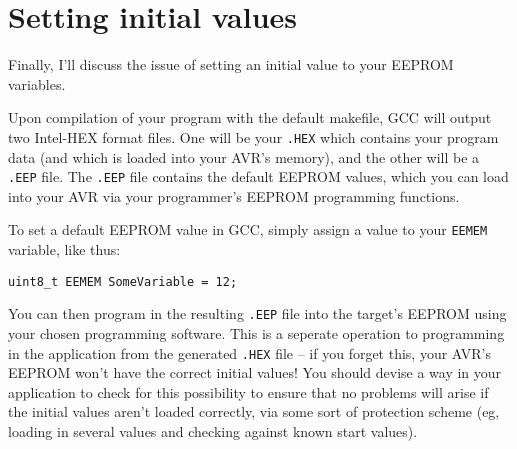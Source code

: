 \documentclass[a4paper,oneside,notitlepage]{book}
\begin{document}
\chapter{Setting initial values}

Finally, I'll discuss the issue of setting an initial value to your EEPROM variables.

Upon compilation of your program with the default makefile, GCC will output two Intel-HEX format files. One will be your \texttt{.HEX} which contains your program data (and which is loaded into your AVR's memory), and the other will be a \texttt{.EEP} file. The \texttt{.EEP} file contains the default EEPROM values, which you can load into your AVR via your programmer's EEPROM programming functions.

To set a default EEPROM value in GCC, simply assign a value to your \lstinline{EEMEM} variable, like thus:

\begin{center}
\begin{lstlisting}
uint8_t EEMEM SomeVariable = 12;
\end{lstlisting}
\end{center}

You can then program in the resulting \texttt{.EEP} file into the target's EEPROM using your chosen programming software. This is a seperate operation to programming in the application from the generated \texttt{.HEX} file -- if you forget this, your AVR's EEPROM won't have the correct initial values! You should devise a way in your application to check for this possibility to ensure that no problems will arise if the initial values aren't loaded correctly, via some sort of protection scheme (eg, loading in several values and checking against known start values).
\end{document}

